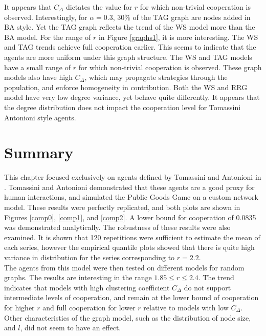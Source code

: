 It appears that $C_\Delta$ dictates the value for $r$ for which non-trivial cooperation is observed. Interestingly, for $\alpha = 0.3$, 30\% of the TAG graph are nodes added in BA style. Yet the TAG graph reflects the trend of the WS model more than the BA model.
\FloatBarrier
{}
\FloatBarrier
For the range of $r$ in Figure \ref{graphs1}, it is more interesting. The WS and TAG trends achieve full cooperation earlier. This seems to indicate that the agents are more uniform under this graph structure. The WS and TAG models have a small range of $r$ for which non-trivial cooperation is observed. These graph models also have high $C_\Delta$, which may propagate strategies through the population, and enforce homogeneity in contribution. Both the WS and RRG model have very low degree variance, yet behave quite differently. It appears that the degree distribution does not impact the cooperation level for Tomassini Antonioni style agents. \\

\section{Summary}

This chapter focused exclusively on agents defined by Tomassini and Antonioni in \cite{RN49}. Tomassini and Antonioni demonstrated that these agents are a good proxy for human interactions, and simulated the Public Goods Game on a custom network model. These results were perfectly replicated, and both plots are shown in Figures \ref{comp0}, \ref{comp1}, and \ref{comp2}.  A lower bound for cooperation of 0.0835 was demonstrated analytically. The robustness of these results were also examined. It is shown that 120 repetitions were sufficient to estimate the mean of each series, however the empirical quantile plots showed that there is quite high variance in distribution for the series corresponding to $r=2.2$.\\ 

The agents from this model were then tested on different models for random graphs. The results are interesting in the range $1.85\leq r \leq 2.4$. The trend indicates that models with high clustering coefficient $C_\Delta$ do not support intermediate levels of cooperation, and remain at the lower bound of cooperation for higher $r$ and full cooperation for lower $r$ relative to models with low $C_\Delta$. Other characteristics of the graph model, such as the distribution of node size, and $l$, did not seem to have an effect. \\



